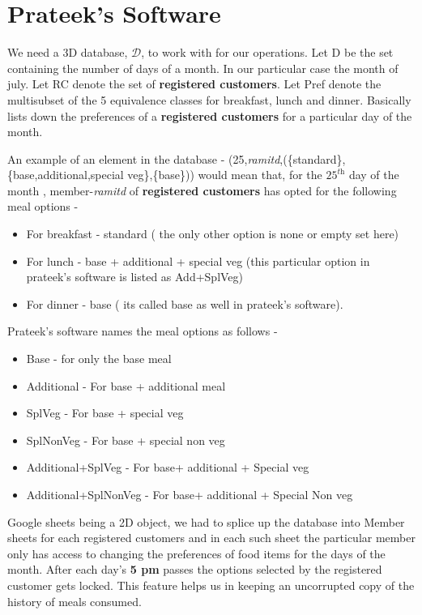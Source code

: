 \documentclass[12pt]{report}
\newcommand{\RC}{\textbf{registered customers}}
\begin{document}
\section{Prateek's Software}
We need a 3D database, $\mathcal{D}$, to work with for our operations. Let D be the set containing the number of days of a month. In our particular case the month of july. Let RC denote the set of {\RC}. Let Pref denote the multisubset of the 5 equivalence classes for breakfast, lunch and dinner. Basically lists down the preferences of a {\RC} for a particular day of the month.
{} 

An example of an element in the database - (25,\textit{ramitd},(\{standard\},\{base,additional,special veg\},\{base\})) would mean that, for the $25^{\textit{th}}$ day of the month , member-\textit{ramitd}  of {\RC} has opted for the following meal options  - 
  \begin{itemize}
  \item For breakfast - standard ( the only other option is none or empty set here)
  \item For lunch - base + additional + special veg (this particular option in prateek's software is listed as Add+SplVeg)
  \item For dinner - base ( its called base as well in prateek's software).
  \end{itemize}


Prateek's software names the meal options as follows -
\begin{itemize}
\item Base - for only the base meal
\item Additional - For base + additional meal
\item SplVeg - For base + special veg
\item SplNonVeg - For base + special non veg
\item Additional+SplVeg - For base+ additional + Special veg
\item Additional+SplNonVeg - For base+ additional + Special Non veg
\end{itemize}

Google sheets being a 2D object, we had to splice up the database into Member sheets for each registered customers and in each such sheet the particular member only has access to changing the preferences of food items for the days of the month. After each day's \textbf{5 pm} passes the options selected by the registered customer gets locked. This feature helps us in keeping an uncorrupted copy of the history of meals consumed.
\end{document}

